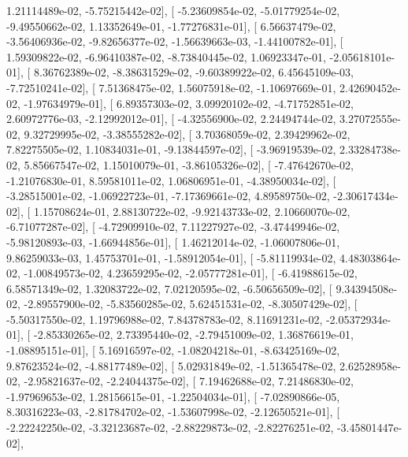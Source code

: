 \documentclass{article}
\begin{document}
          1.21114489e-02,  -5.75215442e-02],
       [ -5.23609854e-02,  -5.01779254e-02,  -9.49550662e-02,
          1.13352649e-01,  -1.77276831e-01],
       [  6.56637479e-02,  -3.56406936e-02,  -9.82656377e-02,
         -1.56639663e-03,  -1.44100782e-01],
       [  1.59309822e-02,  -6.96410387e-02,  -8.73840445e-02,
          1.06923347e-01,  -2.05618101e-01],
       [  8.36762389e-02,  -8.38631529e-02,  -9.60389922e-02,
          6.45645109e-03,  -7.72510241e-02],
       [  7.51368475e-02,   1.56075918e-02,  -1.10697669e-01,
          2.42690452e-02,  -1.97634979e-01],
       [  6.89357303e-02,   3.09920102e-02,  -4.71752851e-02,
          2.60972776e-03,  -2.12992012e-01],
       [ -4.32556900e-02,   2.24494744e-02,   3.27072555e-02,
          9.32729995e-02,  -3.38555282e-02],
       [  3.70368059e-02,   2.39429962e-02,   7.82275505e-02,
          1.10834031e-01,  -9.13844597e-02],
       [ -3.96919539e-02,   2.33284738e-02,   5.85667547e-02,
          1.15010079e-01,  -3.86105326e-02],
       [ -7.47642670e-02,  -1.21076830e-01,   8.59581011e-02,
          1.06806951e-01,  -4.38950034e-02],
       [ -3.28515001e-02,  -1.06922723e-01,  -7.17369661e-02,
          4.89589750e-02,  -2.30617434e-02],
       [  1.15708624e-01,   2.88130722e-02,  -9.92143733e-02,
          2.10660070e-02,  -6.71077287e-02],
       [ -4.72909910e-02,   7.11227927e-02,  -3.47449946e-02,
         -5.98120893e-03,  -1.66944856e-01],
       [  1.46212014e-02,  -1.06007806e-01,   9.86259033e-03,
          1.45753701e-01,  -1.58912054e-01],
       [ -5.81119934e-02,   4.48303864e-02,  -1.00849573e-02,
          4.23659295e-02,  -2.05777281e-01],
       [ -6.41988615e-02,   6.58571349e-02,   1.32083722e-02,
          7.02120595e-02,  -6.50656509e-02],
       [  9.34394508e-02,  -2.89557900e-02,  -5.83560285e-02,
          5.62451531e-02,  -8.30507429e-02],
       [ -5.50317550e-02,   1.19796988e-02,   7.84378783e-02,
          8.11691231e-02,  -2.05372934e-01],
       [ -2.85330265e-02,   2.73395440e-02,  -2.79451009e-02,
          1.36876619e-01,  -1.08895151e-01],
       [  5.16916597e-02,  -1.08204218e-01,  -8.63425169e-02,
          9.87623524e-02,  -4.88177489e-02],
       [  5.02931849e-02,  -1.51365478e-02,   2.62528958e-02,
         -2.95821637e-02,  -2.24044375e-02],
       [  7.19462688e-02,   7.21486830e-02,  -1.97969653e-02,
          1.28156615e-01,  -1.22504034e-01],
       [ -7.02890866e-05,   8.30316223e-03,  -2.81784702e-02,
         -1.53607998e-02,  -2.12650521e-01],
       [ -2.22242250e-02,  -3.32123687e-02,  -2.88229873e-02,
         -2.82276251e-02,  -3.45801447e-02],
\end{document}
